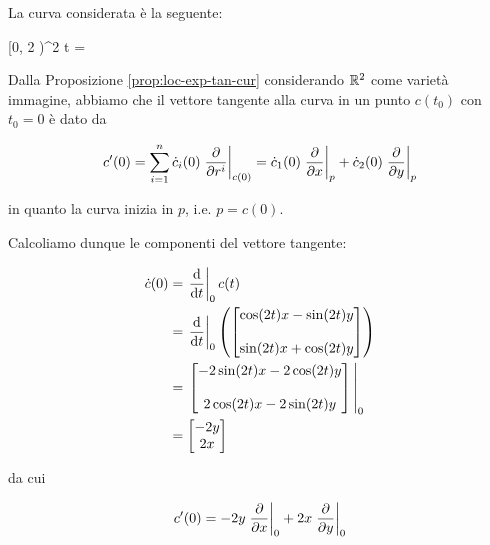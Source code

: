 {
La curva considerata è la seguente:

	{[0, 2 \pi)}{\R^{2}}
	{t}{%
		= %
		}

Dalla Proposizione \ref{prop:loc-exp-tan-cur} considerando $ \mathbb{R}^{2} $ come varietà immagine, abbiamo che il vettore tangente alla curva in un punto $ c(t_{0}) $ con $ t_{0} = 0 $ è dato da

\begin{equation}
	c'(0) = \sum_{i=1}^{n} \dot{c}_{i}(0) \eval{ \pdv{r^{i}} }_{c(0)} %
	= \dot{c}_{1}(0) \eval{ \pdv{x} }_{p} + \dot{c}_{2}(0) \eval{ \pdv{y} }_{p}
\end{equation}

in quanto la curva inizia in $ p $, i.e. $ p = c(0) $.

Calcoliamo dunque le componenti del vettore tangente:

\begin{align}
	\begin{split}
		\dot{c}(0) &= \eval{ \dv{t} }_{0} c(t) \\
		&= \eval{ \dv{t} }_{0} \left( \bmqty{ \cos(2t) x - \sin(2t) y \\ \\ \sin(2t) x + \cos(2t) y } \right) \\
		&= \eval{ \bmqty{ - 2 \sin(2t) x - 2 \cos(2t) y \\ \\ 2 \cos(2t) x - 2 \sin(2t) y } }_{0} \\
		&= \bmqty{ - 2 y \\ 2x }
	\end{split}
\end{align}

da cui

\begin{equation}
	c'(0) = - 2 y \eval{ \pdv{x} }_{0} + 2 x \eval{ \pdv{y} }_{0}
\end{equation}
}


